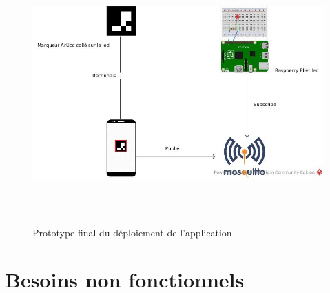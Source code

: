 \documentclass[12pt,a4paper]{article}
\begin{document}
\begin{figure}[H]
  \centering
  \includegraphics[width = 15cm,height=10cm]{maquette_finale.jpg}
  \caption{Prototype final du déploiement de l'application}
\end{figure}



\section{Besoins non fonctionnels}
\end{document}
